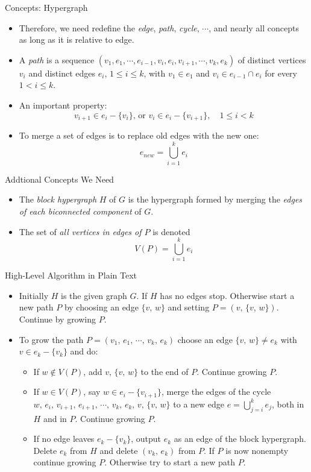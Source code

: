 \documentclass{beamer}
\begin{document}
\begin{frame}{Concepts: Hypergraph}
	\begin{itemize}
		\item
		Therefore, we need redefine the \emph{edge}, \emph{path}, \emph{cycle}, $\cdots$, 
		and nearly all concepts as long as it is relative to edge.
		\item
		A \emph{path} is a sequence $(v_1, e_1, \cdots, e_{i-1}, v_i, e_i, v_{i+1}, \cdots, v_k, e_k)$ of distinct vertices
		$v_i$ and distinct edges $e_i$, $1\leq i\leq k$, with $v_1\in e_1$ and $v_i\in e_{i-1}\cap e_i$
		for every $1 < i\leq k$.
		\item
		An important property:
		$$v_{i+1}\in e_i-\{v_i\} \text{, or } v_{i}\in e_i-\{v_{i+1}\}, \quad 1\leq i < k$$
		\item
		To \alert{merge} a set of edges is to replace old edges with the new one:
		$$e_{new}=\bigcup_{i=1}^ke_i$$
	\end{itemize}
\end{frame}

\begin{frame}{Addtional Concepts We Need}
	\begin{itemize}
		\item
		The \emph{block hypergraph} $H$ of $G$ is the hypergraph formed by merging the \emph{edges of each biconnected component} of $G$.
		\item
		The set of \emph{all vertices in edges of $P$} is denoted
		$$V(P)=\bigcup_{i=1}^ke_i$$
	\end{itemize}
\end{frame}

\begin{frame}{High-Level Algorithm in Plain Text}
	\begin{itemize}
		\item
		Initially $H$ is the given graph $G$. If $H$ has no edges stop. Otherwise start a new path $P$ by choosing an edge 
		$\{v,\,w\}$ and setting $P=(v,\,\{v,\,w\})$. Continue by growing $P$.
		\item
		To grow the path $P=(v_1,\,e_1,\,\cdots,\,v_k,\,e_k)$ choose an edge $\{v,\,w\}\neq e_k$ with $v\in e_k-\{v_k\}$ and do:
		\begin{itemize}
			\item
			If $w\notin V(P)$, add $v,\,\{v,\,w\}$ to the end of $P$. Continue growing $P$.
			\item
			If $w\in V(P)$, say $w\in e_i-\{v_{i+1}\}$, merge the edges of the cycle $w,\,e_i,\,v_{i+1},\,e_{i+1},\,\cdots,\,v_k,\,e_k,\,v,\,\{v,\,w\}$
			to a new edge $e=\bigcup_{j=i}^ke_j$, both in $H$ and in $P$. Continue growing $P$.
			\item
			If no edge leaves $e_k-\{v_k\}$, output $e_k$ as an edge of the block hypergraph. Delete $e_k$ from $H$ and delete $(v_k,\,e_k)$
			from $P$. If $P$ is now nonempty continue growing $P$. Otherwise try to start a new path $P$.
		\end{itemize}
	\end{itemize}
\end{frame}
\end{document}
